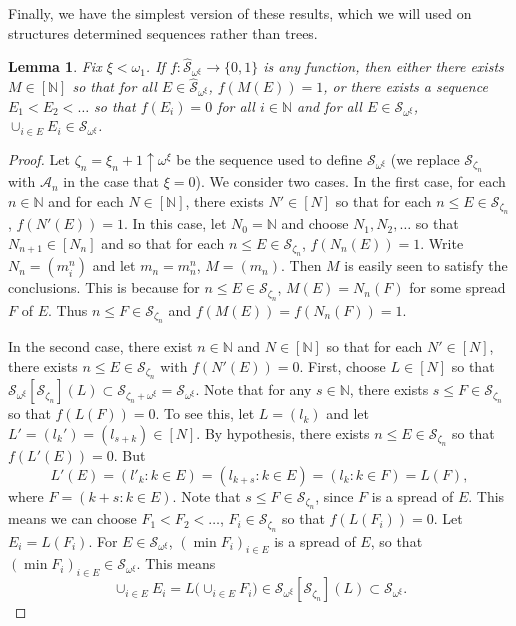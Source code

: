 \documentclass[12pt]{amsart}
\newtheorem{lemma}[theorem]{Lemma}
\theoremstyle{definition}
\newcommand{\infin}{[\mathbb{N}]}
\newcommand{\nn}{\mathbb{N}}
\newcommand{\aaa}{\mathcal{A}}
\newcommand{\sss}{\mathcal{S}}
\begin{document}
 
Finally, we have the simplest version of these results, which we will used on structures determined sequences rather than trees.  

\begin{lemma} Fix $\xi<\omega_1$.  If $f:\widehat{\sss}_{\omega^\xi}\to \{0,1\}$ is any function, then either there exists $M\in \infin$ so that for all $E\in \widehat{\sss}_{\omega^\xi}$, $f(M(E))=1$, or there exists a sequence $E_1<E_2<\ldots$ so that $f(E_i)=0$ for all $i\in \nn$ and for all $E\in \sss_{\omega^\xi}$, $\cup_{i\in E} E_i\in \sss_{\omega^\xi}$.  


\label{easy coloring}
\end{lemma}


\begin{proof} Let $\zeta_n=\xi_n+1\uparrow \omega^\xi$ be the sequence used to define $\sss_{\omega^\xi}$ (we replace $\sss_{\zeta_n}$ with $\aaa_n$ in the case that $\xi=0$).  We consider two cases.  In the first case, for each $n\in \nn$ and for each $N\in \infin$, there exists $N'\in [N]$ so that for each $n\leqslant E\in \sss_{\zeta_n}$, $f(N'(E))=1$.  In this case, let $N_0=\nn$ and choose $N_1, N_2, \ldots$ so that $N_{n+1}\in [N_n]$ and so that for each $n\leqslant E\in \sss_{\zeta_n}$, $f(N_n(E))=1$.  Write $N_n=(m^n_i)$ and let $m_n= m^n_n$, $M=(m_n)$.  Then $M$ is easily seen to satisfy the conclusions.  This is because for $n\leqslant E\in \sss_{\zeta_n}$, $M(E)= N_n(F)$ for some spread $F$ of $E$.  Thus $n\leqslant F\in \sss_{\zeta_n}$ and $f(M(E))=f(N_n(F))= 1$.  

In the second case, there exist $n\in \nn$ and $N\in \infin$ so that for each $N'\in [N]$, there exists $n\leqslant E\in \sss_{\zeta_n}$ with $f(N'(E))=0$.  First, choose $L\in [N]$ so that $\sss_{\omega^\xi}[\sss_{\zeta_n}](L)\subset \sss_{\zeta_n+\omega^\xi}= \sss_{\omega^\xi}$.  Note that for any $s\in \nn$, there exists $s\leqslant F\in \sss_{\zeta_n}$ so that $f(L(F))=0$.  To see this, let $L=(l_k)$ and let $L'=(l_k')=(l_{s+k})\in [N]$.  By hypothesis, there exists $n\leqslant E\in \sss_{\zeta_n}$ so that $f(L'(E))= 0$.  But $$L'(E)= (l'_k: k\in E)= (l_{k+s}: k\in E)= (l_k: k\in F)=L(F),$$ where $F=(k+s: k\in E)$.  Note that $s\leqslant F\in \sss_{\zeta_n}$, since $F$ is a spread of $E$.  This means we can choose $F_1<F_2<\ldots$, $F_i\in \sss_{\zeta_n}$ so that $f(L(F_i))=0$.  Let $E_i=L(F_i)$.  For $E\in \sss_{\omega^\xi}$, $(\min F_i)_{i\in E}$ is a spread of $E$, so that $(\min F_i)_{i\in E}\in \sss_{\omega^\xi}$.  This means $$\cup_{i\in E} E_i = L\bigl(\cup_{i\in E}F_i\bigr)\in \sss_{\omega^\xi}[\sss_{\zeta_n}](L)\subset \sss_{\omega^\xi}.$$  




\end{proof}
\end{document}
